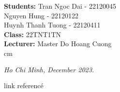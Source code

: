 \documentclass[oneside,a4paper,14pt]{extreport}
\begin{document}
\begin{titlepage}
\begin{mybox}
\begin{center}
				
			\end{center}
			\vskip 1cm
			\doublespacing
			\hspace*{0.5cm}
			\fontsize{14}{12}\selectfont
			\textbf{Students:}
			Tran Ngoc Dai - 22120045\\
			\hspace*{3.2cm}Nguyen Hung - 22120122\\
			\hspace*{3.2cm}Huynh Thanh Tuong - 22120411\\
			\hspace*{0cm}
			\quad\textbf{Class:} 22TNT1TN\\
			\hspace*{0cm}
			\quad\textbf{Lecturer:} Master Do Hoang Cuong\\
			
			
			
			 cm
			\begin{center}
				\textit{Ho Chi Minh, December 2023.}
			\end{center}
		\end{mybox}
	\end{titlepage}
	\newpage

 
    \tableofcontents
    \newpage
    
        

        

        

	\begin{thebibliography}{}	
		link referencé
	\end{thebibliography}
\end{document}

